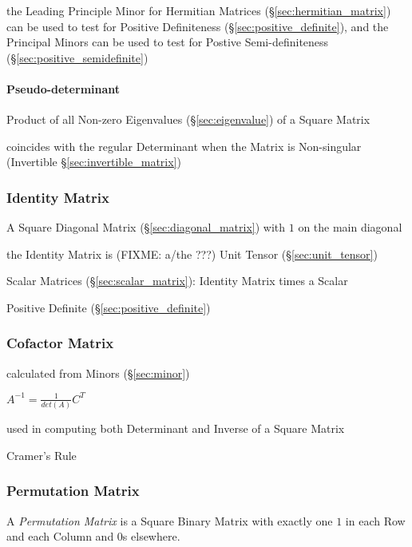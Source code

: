 the Leading Principle Minor for Hermitian Matrices
(\S\ref{sec:hermitian_matrix}) can be used to test for Positive Definiteness
(\S\ref{sec:positive_definite}), and the Principal Minors can be used to test
for Postive Semi-definiteness (\S\ref{sec:positive_semidefinite})



\paragraph{Pseudo-determinant}\label{sec:pseudo_determinant}\hfill

Product of all Non-zero Eigenvalues (\S\ref{sec:eigenvalue}) of a Square Matrix

coincides with the regular Determinant when the Matrix is Non-singular
(Invertible \S\ref{sec:invertible_matrix})



\subsubsection{Identity Matrix}\label{sec:identity_matrix}

A Square Diagonal Matrix (\S\ref{sec:diagonal_matrix}) with $1$ on the main
diagonal

the Identity Matrix is (FIXME: a/the ???) Unit Tensor (\S\ref{sec:unit_tensor})

Scalar Matrices (\S\ref{sec:scalar_matrix}): Identity Matrix times a Scalar

Positive Definite (\S\ref{sec:positive_definite})



\subsubsection{Cofactor Matrix}\label{sec:cofactor_matrix}

calculated from Minors (\S\ref{sec:minor})

$A^{-1} = \frac{1}{det(A)}C^T$

used in computing both Determinant and Inverse of a Square Matrix

Cramer's Rule



\subsubsection{Permutation Matrix}\label{sec:permutation_matrix}

A \emph{Permutation Matrix} is a Square Binary Matrix with exactly one
$1$ in each Row and each Column and $0$s elsewhere.

